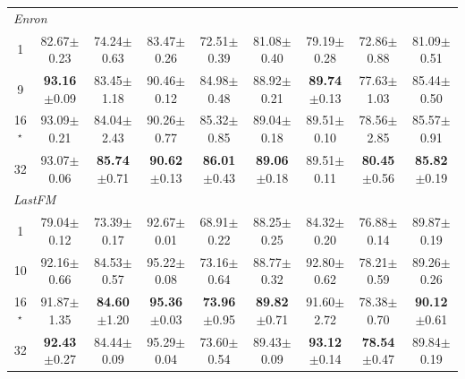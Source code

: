 \begin{table}[p]
\begin{tabular}{ccccccccc}
\midrule
\multicolumn{9}{l}{\textit{Enron}} \\
1 & 82.67{\scriptsize$\pm$0.23} & 74.24{\scriptsize$\pm$0.63} & 83.47{\scriptsize$\pm$0.26} & 72.51{\scriptsize$\pm$0.39} & 81.08{\scriptsize$\pm$0.40} & 79.19{\scriptsize$\pm$0.28} & 72.86{\scriptsize$\pm$0.88} & 81.09{\scriptsize$\pm$0.51} \\
9 & \textbf{93.16}{\scriptsize$\pm$0.09} & 83.45{\scriptsize$\pm$1.18} & 90.46{\scriptsize$\pm$0.12} & 84.98{\scriptsize$\pm$0.48} & 88.92{\scriptsize$\pm$0.21} & \textbf{89.74}{\scriptsize$\pm$0.13} & 77.63{\scriptsize$\pm$1.03} & 85.44{\scriptsize$\pm$0.50} \\
16$^\star$ & 93.09{\scriptsize$\pm$0.21} & 84.04{\scriptsize$\pm$2.43} & 90.26{\scriptsize$\pm$0.77} & 85.32{\scriptsize$\pm$0.85} & 89.04{\scriptsize$\pm$0.18} & 89.51{\scriptsize$\pm$0.10} & 78.56{\scriptsize$\pm$2.85} & 85.57{\scriptsize$\pm$0.91} \\
32 & 93.07{\scriptsize$\pm$0.06} & \textbf{85.74}{\scriptsize$\pm$0.71} & \textbf{90.62}{\scriptsize$\pm$0.13} & \textbf{86.01}{\scriptsize$\pm$0.43} & \textbf{89.06}{\scriptsize$\pm$0.18} & 89.51{\scriptsize$\pm$0.11} & \textbf{80.45}{\scriptsize$\pm$0.56} & \textbf{85.82}{\scriptsize$\pm$0.19} \\
\midrule
\multicolumn{9}{l}{\textit{LastFM}} \\
1 & 79.04{\scriptsize$\pm$0.12} & 73.39{\scriptsize$\pm$0.17} & 92.67{\scriptsize$\pm$0.01} & 68.91{\scriptsize$\pm$0.22} & 88.25{\scriptsize$\pm$0.25} & 84.32{\scriptsize$\pm$0.20} & 76.88{\scriptsize$\pm$0.14} & 89.87{\scriptsize$\pm$0.19} \\
10 & 92.16{\scriptsize$\pm$0.66} & 84.53{\scriptsize$\pm$0.57} & 95.22{\scriptsize$\pm$0.08} & 73.16{\scriptsize$\pm$0.64} & 88.77{\scriptsize$\pm$0.32} & 92.80{\scriptsize$\pm$0.62} & 78.21{\scriptsize$\pm$0.59} & 89.26{\scriptsize$\pm$0.26} \\
16$^\star$ & 91.87{\scriptsize$\pm$1.35} & \textbf{84.60}{\scriptsize$\pm$1.20} & \textbf{95.36}{\scriptsize$\pm$0.03} & \textbf{73.96}{\scriptsize$\pm$0.95} & \textbf{89.82}{\scriptsize$\pm$0.71} & 91.60{\scriptsize$\pm$2.72} & 78.38{\scriptsize$\pm$0.70} & \textbf{90.12}{\scriptsize$\pm$0.61} \\
32 & \textbf{92.43}{\scriptsize$\pm$0.27} & 84.44{\scriptsize$\pm$0.09} & 95.29{\scriptsize$\pm$0.04} & 73.60{\scriptsize$\pm$0.54} & 89.43{\scriptsize$\pm$0.09} & \textbf{93.12}{\scriptsize$\pm$0.14} & \textbf{78.54}{\scriptsize$\pm$0.47} & 89.84{\scriptsize$\pm$0.19} \\
\bottomrule
\end{tabular}
\end{table}
